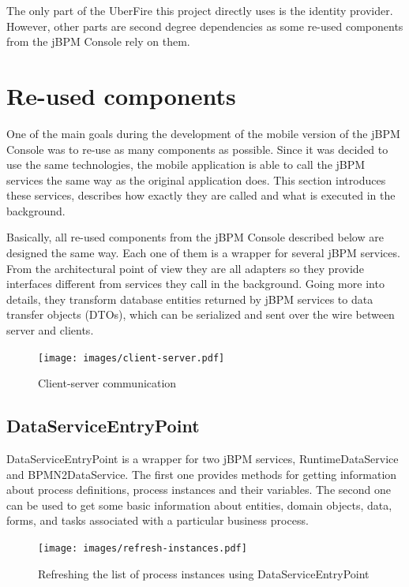 \documentclass[12pt,oneside,final]{fithesis2}
\begin{document}
The only part of the UberFire this project directly uses is the identity provider.
However, other parts are second degree dependencies as some re-used components from the jBPM Console rely on them.

\section{Re-used components}
One of the main goals during the development of the mobile version of the jBPM Console was to re-use as many components as possible.
Since it was decided to use the same technologies, the mobile application is able to call the jBPM services the same way as the original application does.
This section introduces these services, describes how exactly they are called and what is executed in the background.

Basically, all re-used components from the jBPM Console described below are designed the same way.
Each one of them is a wrapper for several jBPM services.
From the architectural point of view they are all adapters so they provide interfaces different from services they call in the background.
Going more into details, they transform database entities returned by jBPM services to data transfer objects (DTOs), which can be serialized and sent over the wire between server and clients.

\begin{figure}[ht!]
\centering
\texttt{[image: images/client-server.pdf]}
\caption{Client-server communication}
\label{fig:client-server}
\end{figure}

\label{sec:reused-components}
\subsection{DataServiceEntryPoint}

DataServiceEntryPoint is a wrapper for two jBPM services, RuntimeDataService and BPMN2DataService.
The first one provides methods for getting information about process definitions, process instances and their variables.
The second one can be used to get some basic information about entities, domain objects, data, forms, and tasks associated with a particular business process.

\begin{figure}[ht!]
\centering
\texttt{[image: images/refresh-instances.pdf]}
\caption{Refreshing the list of process instances using DataServiceEntryPoint}
\label{fig:refresh-instances}
\end{figure}
\end{document}
